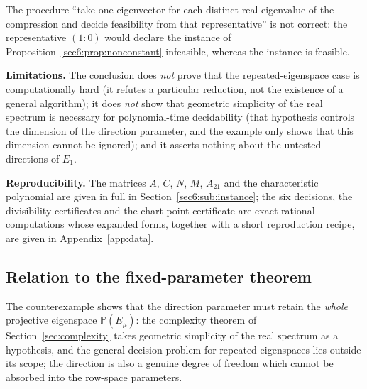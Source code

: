 \begin{cor}\label{sec6:cor:reduction}
The procedure ``take one eigenvector for each distinct real eigenvalue of the compression and decide
feasibility from that representative'' is not correct: the representative $(1\!:\!0)$ would declare the
instance of Proposition~\ref{sec6:prop:nonconstant} infeasible, whereas the instance is feasible.
\end{cor}

\textbf{Limitations.} The conclusion does \emph{not} prove that the repeated-eigenspace case is
computationally hard (it refutes a particular reduction, not the existence of a general algorithm); it
does \emph{not} show that geometric simplicity of the real spectrum is necessary for polynomial-time
decidability (that hypothesis controls the dimension of the direction parameter, and the example only
shows that this dimension cannot be ignored); and it asserts nothing about the untested directions of
$E_1$.

\textbf{Reproducibility.} The matrices $A$, $C$, $N$, $M$, $A_{21}$ and the characteristic polynomial
are given in full in Section~\ref{sec6:sub:instance}; the six decisions, the divisibility certificates
and the chart-point certificate are exact rational computations whose expanded forms, together with a
short reproduction recipe, are given in Appendix~\ref{app:data}.

\subsection{Relation to the fixed-parameter theorem}\label{sec6:sub:relation}

The counterexample shows that the direction parameter must retain the \emph{whole} projective eigenspace
$\mathbb{P}(E_\mu)$: the complexity theorem of Section~\ref{sec:complexity} takes geometric simplicity of
the real spectrum as a hypothesis, and the general decision problem for repeated eigenspaces lies
outside its scope; the direction is also a genuine degree of freedom which cannot be absorbed into the
row-space parameters.
